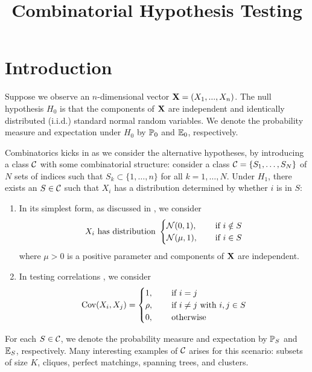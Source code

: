 \documentclass[10pt, oneside]{article}
\begin{document}
\thispagestyle{empty}
\title{Combinatorial Hypothesis Testing}



\maketitle
\addtocounter{footnote}{-1}\let\thefootnote\svthefootnote

\section{Introduction}

Suppose we observe an $n$-dimensional vector $\mathbf{X} = (X_1,...,X_n)$. The null hypothesis $H_0$ is that the components of $\mathbf{X}$ are independent and identically distributed (i.i.d.) standard normal random variables. We denote the probability measure and expectation under $H_0$ by $\mathbb{P}_0$ and $\mathbb{E}_0$, respectively.

Combinatorics kicks in as we consider the alternative hypotheses, by introducing a class ${\mathcal C}$ with some combinatorial structure: consider a class ${\mathcal C}=\{S_1,\ldots,S_N\}$ of $N$ sets of indices such that $S_k \subset\{1,\ldots,n\}$ for all $k=1,\ldots,N$. Under $H_1$, there
exists an $S \in {\mathcal C}$ such that $X_i$ has a distribution determined by whether $i$ is in $S$:
\begin{enumerate}
  \item In its simplest form, as discussed in \cite{arias2008searching, addario2010combinatorial, arias2011detection}, we consider 
$$
X_i \mbox{ has distribution }
\begin{cases}
  {\mathcal N}(0,1), \quad & \mbox{ if }i \notin S\\
  {\mathcal N}(\mu,1), & \mbox{ if }i \in S
\end{cases}
$$
where $\mu>0$ is a positive parameter and components of $\mathbf{X}$ are independent. 
  \item In testing correlations \cite{arias2012correlation}, we consider $$
  \operatorname{Cov}(X_i, X_j) =
  \begin{cases}
    1, \quad & \mbox{ if }i = j\\
    \rho, & \mbox{ if }i \neq j\mbox{ with }i, j \in S\\
    0, & \mbox{ otherwise}\\
  \end{cases}
  $$
\end{enumerate}

For each $S \in {\mathcal C}$, we denote the probability measure and expectation by $\mathbb{P}_S$ and $\mathbb{E}_S$, respectively. Many interesting examples of ${\mathcal C}$ arises for this scenario: subsets of size $K$, cliques, perfect matchings, spanning trees, and clusters.
\end{document}
